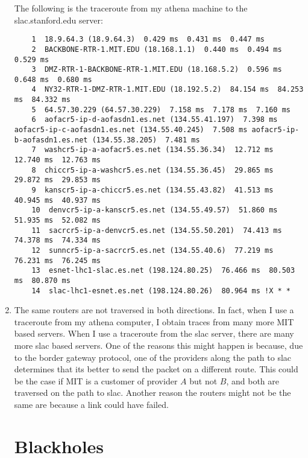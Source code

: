 \documentclass[psamsfonts]{amsart}
\begin{document}
\begin{enumerate}
    The following is the traceroute from my athena machine to the slac.stanford.edu server:
    \begin{verbatim}
    1  18.9.64.3 (18.9.64.3)  0.429 ms  0.431 ms  0.447 ms
    2  BACKBONE-RTR-1.MIT.EDU (18.168.1.1)  0.440 ms  0.494 ms  0.529 ms
    3  DMZ-RTR-1-BACKBONE-RTR-1.MIT.EDU (18.168.5.2)  0.596 ms  0.648 ms  0.680 ms
    4  NY32-RTR-1-DMZ-RTR-1.MIT.EDU (18.192.5.2)  84.154 ms  84.253 ms  84.332 ms
    5  64.57.30.229 (64.57.30.229)  7.158 ms  7.178 ms  7.160 ms
    6  aofacr5-ip-d-aofasdn1.es.net (134.55.41.197)  7.398 ms aofacr5-ip-c-aofasdn1.es.net (134.55.40.245)  7.508 ms aofacr5-ip-b-aofasdn1.es.net (134.55.38.205)  7.481 ms
    7  washcr5-ip-a-aofacr5.es.net (134.55.36.34)  12.712 ms  12.740 ms  12.763 ms
    8  chiccr5-ip-a-washcr5.es.net (134.55.36.45)  29.865 ms  29.872 ms  29.853 ms
    9  kanscr5-ip-a-chiccr5.es.net (134.55.43.82)  41.513 ms  40.945 ms  40.937 ms
    10  denvcr5-ip-a-kanscr5.es.net (134.55.49.57)  51.860 ms  51.935 ms  52.082 ms
    11  sacrcr5-ip-a-denvcr5.es.net (134.55.50.201)  74.413 ms  74.378 ms  74.334 ms
    12  sunncr5-ip-a-sacrcr5.es.net (134.55.40.6)  77.219 ms  76.231 ms  76.245 ms
    13  esnet-lhc1-slac.es.net (198.124.80.25)  76.466 ms  80.503 ms  80.870 ms
    14  slac-lhc1-esnet.es.net (198.124.80.26)  80.964 ms !X * *
    \end{verbatim}

  \item The same routers are not traversed in both directions. In fact, when I use a traceroute from my athena computer, I obtain traces from many more MIT based servers. When I use a traceroute from the slac server, there are many more slac based servers. One of the reasons this might happen is because, due to the border gateway protocol, one of the providers along the path to slac determines that its better to send the packet on a different route. This could be the case if MIT is a customer of provider $A$ but not $B$, and both are traversed on the path to slac. Another reason the routers might not be the same are because a link could have failed.

  \section{Blackholes}


\end{enumerate}
\end{document}
